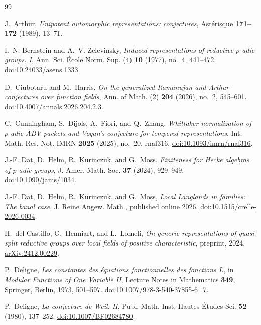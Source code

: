 \begin{thebibliography}{99}

J.~Arthur,
\emph{Unipotent automorphic representations: conjectures},
Ast\'erisque \textbf{171--172} (1989), 13--71.

I.~N. Bernstein and A.~V. Zelevinsky,
\emph{Induced representations of reductive $p$-adic groups. I},
Ann. Sci. \'Ecole Norm. Sup. (4) \textbf{10} (1977), no.~4, 441--472.
\href{https://doi.org/10.24033/asens.1333}{doi:10.24033/asens.1333}.

D.~Ciubotaru and M.~Harris,
\emph{On the generalized Ramanujan and Arthur conjectures over function fields},
Ann. of Math. (2) \textbf{204} (2026), no.~2, 545--601.
\href{https://doi.org/10.4007/annals.2026.204.2.3}{doi:10.4007/annals.2026.204.2.3}.

C.~Cunningham, S.~Dijols, A.~Fiori, and Q.~Zhang,
\emph{Whittaker normalization of $p$-adic ABV-packets and Vogan's conjecture
for tempered representations},
Int. Math. Res. Not. IMRN \textbf{2025} (2025), no.~20, rnaf316.
\href{https://doi.org/10.1093/imrn/rnaf316}{doi:10.1093/imrn/rnaf316}.

J.-F. Dat, D.~Helm, R.~Kurinczuk, and G.~Moss,
\emph{Finiteness for Hecke algebras of $p$-adic groups},
J. Amer. Math. Soc. \textbf{37} (2024), 929--949.
\href{https://doi.org/10.1090/jams/1034}{doi:10.1090/jams/1034}.

J.-F. Dat, D.~Helm, R.~Kurinczuk, and G.~Moss,
\emph{Local Langlands in families: The banal case},
J. Reine Angew. Math., published online 2026.
\href{https://doi.org/10.1515/crelle-2026-0034}{doi:10.1515/crelle-2026-0034}.

H.~del Castillo, G.~Henniart, and L.~Lomel\'i,
\emph{On generic representations of quasi-split reductive groups over
local fields of positive characteristic},
preprint, 2024, \href{https://arxiv.org/abs/2412.00229}{arXiv:2412.00229}.

P.~Deligne,
\emph{Les constantes des \'equations fonctionnelles des fonctions $L$},
in \emph{Modular Functions of One Variable II},
Lecture Notes in Mathematics \textbf{349}, Springer, Berlin, 1973,
501--597.
\href{https://doi.org/10.1007/978-3-540-37855-6_7}{doi:10.1007/978-3-540-37855-6\_7}.

P.~Deligne, \emph{La conjecture de Weil. II},
Publ. Math. Inst. Hautes \'Etudes Sci. \textbf{52} (1980), 137--252.
\href{https://doi.org/10.1007/BF02684780}{doi:10.1007/BF02684780}.


\end{thebibliography}
